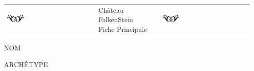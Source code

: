 \documentclass[a5paper,french]{article}
\begin{document}
\begin{center}
	\begin{tabular}[c]{ p{} p{} p{} }
		\includegraphics[width=0.20\textwidth]{../../images/artsdecos/ornement08whiteBG.png} & 
			\centering
			{ \Huge{\setmainfont{Chomsky} Château FalkenStein } }~\newline~\newline~\newline
			{ \LARGE{ \setmainfont{Z003} Fiche Principale } }
		& \includegraphics[width=0.20\textwidth]{../../images/artsdecos/ornement08whiteBG.png} \\
	\end{tabular}
\end{center}

\begin{minipage}[ht]{0.48\textwidth}
	NOM~\newline~\newline
\end{minipage} \hfill \begin{minipage}[ht]{0.48\textwidth}
	ARCHÉTYPE~\newline~\newline
\end{minipage}~\\~\\

\end{document}
